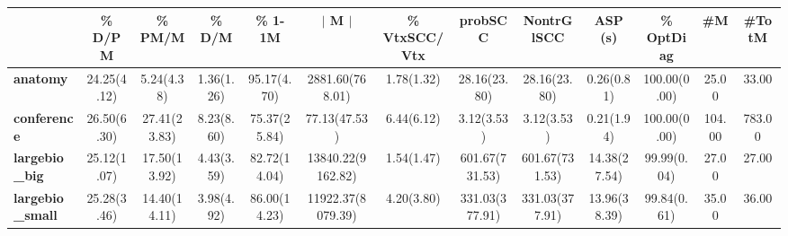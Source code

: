 \begin{tabular}{|l|c|c|c|c|c|c|c|c|c|c|c|c|}
\hline
&\textbf{\% D/PM}&\textbf{\% PM/M}&\textbf{\% D/M}&\textbf{\% 1-1M}&\textbf{$\vert$ M $\vert$}&\textbf{\% VtxSCC/Vtx}&\textbf{probSCC}&\textbf{NontrGlSCC}&\textbf{ASP (s)}&\textbf{\% OptDiag}&\textbf{\#M}&\textbf{\#TotM}\\\hline
\textbf{anatomy}&24.25(4.12)&5.24(4.38)&1.36(1.26)&95.17(4.70)&2881.60(768.01)&1.78(1.32)&28.16(23.80)&28.16(23.80)&0.26(0.81)&100.00(0.00)&25.00&33.00\\\hline
\textbf{conference}&26.50(6.30)&27.41(23.83)&8.23(8.60)&75.37(25.84)&77.13(47.53)&6.44(6.12)&3.12(3.53)&3.12(3.53)&0.21(1.94)&100.00(0.00)&104.00&783.00\\\hline
\textbf{largebio\_big}&25.12(1.07)&17.50(13.92)&4.43(3.59)&82.72(14.04)&13840.22(9162.82)&1.54(1.47)&601.67(731.53)&601.67(731.53)&14.38(27.54)&99.99(0.04)&27.00&27.00\\\hline
\textbf{largebio\_small}&25.28(3.46)&14.40(14.11)&3.98(4.92)&86.00(14.23)&11922.37(8079.39)&4.20(3.80)&331.03(377.91)&331.03(377.91)&13.96(38.39)&99.84(0.61)&35.00&36.00\\\hline
\end{tabular}
